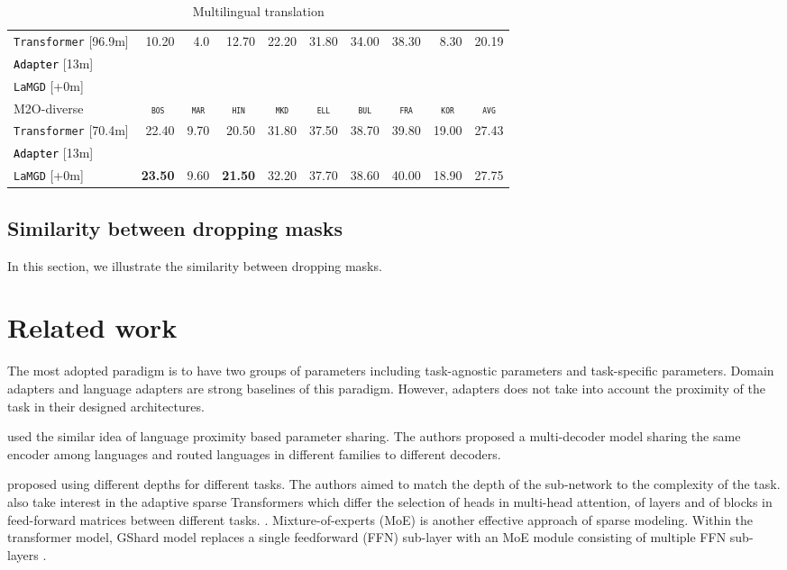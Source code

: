 \documentclass[11pt]{article}
\newcommand{\revision}[1]{\textcolor{black}{#1}}
\newcommand{\domain}[1]{\texttt{\textsc{#1}}}
\newcommand{\system}[1]{\texttt{{#1}}}
\newcommand{\SB}[1]{\textbf{#1}}
\begin{document}
\begin{table}[h!]
\begin{tabular}{|p{4cm}|*{9}{r|}}
    \system{Transformer}  \hfill{\footnotesize[96.9m]} & 10.20&4.0&12.70&22.20&31.80&34.00&38.30&8.30&20.19 \\
    \revision{\system{Adapter}}   \hfill{\footnotesize[13m]}  & & & & & & & & & \\ 
    \system{LaMGD}   \hfill{\footnotesize[+0m]} & & & & & & & & & \\
    \hline 
    \hline
    M2O-diverse & \multicolumn{1}{c|}{\domain{bos}} & \multicolumn{1}{c|}{\domain{mar}} & \multicolumn{1}{c|}{\domain{hin}} & \multicolumn{1}{c|}{\domain{mkd}} & \multicolumn{1}{c|}{\domain{ell}} & \multicolumn{1}{c|}{\domain{bul}} & \multicolumn{1}{c|}{\domain{fra}} & \multicolumn{1}{c|}{\domain{kor}} & \multicolumn{1}{c|}{\domain{avg}} \\ \hline 
    \system{Transformer}  \hfill{\footnotesize[70.4m]} &22.40&9.70&20.50&31.80&37.50&38.70&39.80&19.00&27.43 \\
    \revision{\system{Adapter}}   \hfill{\footnotesize[13m]}  & & & & & & & & & \\ 
    \system{LaMGD}   \hfill{\footnotesize[+0m]} &\SB{23.50}&9.60&\SB{21.50}&32.20&37.70&38.60&40.00&18.90&27.75 \\
    \hline
  \end{tabular}
  \caption{Multilingual translation}
  \label{tab:multilingual}
\end{table}
\subsection{Similarity between dropping masks}
In this section, we illustrate the similarity between dropping masks.

\section{Related work}
The most adopted paradigm is to have two groups of parameters including task-agnostic parameters and task-specific parameters. Domain adapters and language adapters are strong baselines of this paradigm. However, adapters does not take into account the proximity of the task in their designed architectures. 

\citep{sen19multilingual,kong21multilingual} used the similar idea of language proximity based parameter sharing. The authors proposed a multi-decoder model sharing the same encoder among languages and routed languages in different families to different decoders.

\citet{xian20deep} proposed using different depths for different tasks. The authors aimed to match the depth of the sub-network to the complexity of the task. \citet{Gong21pay,Gong21adaptive} also take interest in the adaptive sparse Transformers which differ the selection of heads in multi-head attention, of layers and of blocks in feed-forward matrices between different tasks. \citet{Christopher21efficiently}.
Mixture-of-experts (MoE) is another effective approach of sparse modeling. Within the transformer model, GShard model replaces a single feedforward (FFN) sub-layer with an MoE module consisting of multiple FFN sub-layers \citep{lepikhin21gshard}. 
\end{document}
